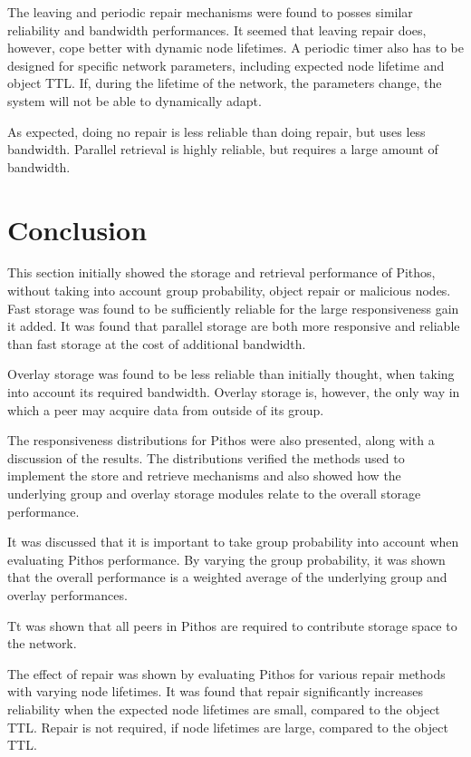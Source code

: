 The leaving and periodic repair mechanisms were found to posses similar reliability and bandwidth performances. It seemed that leaving repair does, however, cope better with dynamic node lifetimes. A periodic timer also has to be designed for specific network parameters, including expected node lifetime and object TTL. If, during the lifetime of the network, the parameters change, the system will not be able to dynamically adapt.

As expected, doing no repair is less reliable than doing repair, but uses less bandwidth. Parallel retrieval is highly reliable, but requires a large amount of bandwidth.

\section{Conclusion}

This section initially showed the storage and retrieval performance of Pithos, without taking into account group probability, object repair or malicious nodes. Fast storage was found to be sufficiently reliable for the large responsiveness gain it added. It was found that parallel storage are both more responsive and reliable than fast storage at the cost of additional bandwidth.

Overlay storage was found to be less reliable than initially thought, when taking into account its required bandwidth. Overlay storage is, however, the only way in which a peer may acquire data from outside of its group.

The responsiveness distributions for Pithos were also presented, along with a discussion of the results. The distributions verified the methods used to implement the store and retrieve mechanisms and also showed how the underlying group and overlay storage modules relate to the overall storage performance.

It was discussed that it is important to take group probability into account when evaluating Pithos performance. By varying the group probability, it was shown that the overall performance is a weighted average of the underlying group and overlay performances.

Tt was shown that all peers in Pithos are required to contribute storage space to the network.

The effect of repair was shown by evaluating Pithos for various repair methods with varying node lifetimes. It was found that repair significantly increases reliability when the expected node lifetimes are small, compared to the object TTL. Repair is not required, if node lifetimes are large, compared to the object TTL.

